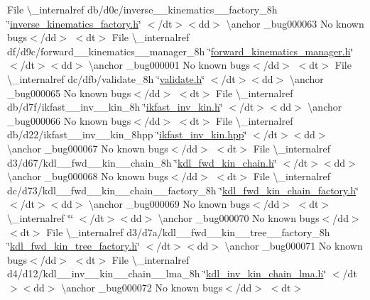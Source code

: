 \begin{DoxyRefList}
\+File \textbackslash{}\+\_\+internalref db/d0c/inverse\+\_\+\+\_\+kinematics\+\_\+\+\_\+factory\+\_\+8h \char`\"{}\mbox{\hyperlink{inverse__kinematics__factory_8h}{inverse\+\_\+kinematics\+\_\+factory.\+h}}\char`\"{} $<$/dt$>$$<$dd$>$ \textbackslash{}anchor \+\_\+bug000063 No known bugs$<$/dd$>$ $<$dt$>$
\+File \textbackslash{}\+\_\+internalref df/d9c/forward\+\_\+\+\_\+kinematics\+\_\+\+\_\+manager\+\_\+8h \char`\"{}\mbox{\hyperlink{forward__kinematics__manager_8h}{forward\+\_\+kinematics\+\_\+manager.\+h}}\char`\"{} $<$/dt$>$$<$dd$>$ \textbackslash{}anchor \+\_\+bug000001 No known bugs$<$/dd$>$ $<$dt$>$
\+File \textbackslash{}\+\_\+internalref dc/dfb/validate\+\_\+8h \char`\"{}\mbox{\hyperlink{validate_8h}{validate.\+h}}\char`\"{} $<$/dt$>$$<$dd$>$ \textbackslash{}anchor \+\_\+bug000065 No known bugs$<$/dd$>$ $<$dt$>$
\+File \textbackslash{}\+\_\+internalref db/d7f/ikfast\+\_\+\+\_\+inv\+\_\+\+\_\+kin\+\_\+8h \char`\"{}\mbox{\hyperlink{ikfast__inv__kin_8h}{ikfast\+\_\+inv\+\_\+kin.\+h}}\char`\"{} $<$/dt$>$$<$dd$>$ \textbackslash{}anchor \+\_\+bug000066 No known bugs$<$/dd$>$ $<$dt$>$
\+File \textbackslash{}\+\_\+internalref db/d22/ikfast\+\_\+\+\_\+inv\+\_\+\+\_\+kin\+\_\+8hpp \char`\"{}\mbox{\hyperlink{ikfast__inv__kin_8hpp}{ikfast\+\_\+inv\+\_\+kin.\+hpp}}\char`\"{} $<$/dt$>$$<$dd$>$ \textbackslash{}anchor \+\_\+bug000067 No known bugs$<$/dd$>$ $<$dt$>$
\+File \textbackslash{}\+\_\+internalref d3/d67/kdl\+\_\+\+\_\+fwd\+\_\+\+\_\+kin\+\_\+\+\_\+chain\+\_\+8h \char`\"{}\mbox{\hyperlink{kdl__fwd__kin__chain_8h}{kdl\+\_\+fwd\+\_\+kin\+\_\+chain.\+h}}\char`\"{} $<$/dt$>$$<$dd$>$ \textbackslash{}anchor \+\_\+bug000068 No known bugs$<$/dd$>$ $<$dt$>$
\+File \textbackslash{}\+\_\+internalref dc/d73/kdl\+\_\+\+\_\+fwd\+\_\+\+\_\+kin\+\_\+\+\_\+chain\+\_\+\+\_\+factory\+\_\+8h \char`\"{}\mbox{\hyperlink{kdl__fwd__kin__chain__factory_8h}{kdl\+\_\+fwd\+\_\+kin\+\_\+chain\+\_\+factory.\+h}}\char`\"{} $<$/dt$>$$<$dd$>$ \textbackslash{}anchor \+\_\+bug000069 No known bugs$<$/dd$>$ $<$dt$>$
 \textbackslash{}\+\_\+internalref  \char`\"{}\char`\"{} $<$/dt$>$$<$dd$>$ \textbackslash{}anchor \+\_\+bug000070 No known bugs$<$/dd$>$ $<$dt$>$
\+File \textbackslash{}\+\_\+internalref d3/d7a/kdl\+\_\+\+\_\+fwd\+\_\+\+\_\+kin\+\_\+\+\_\+tree\+\_\+\+\_\+factory\+\_\+8h \char`\"{}\mbox{\hyperlink{kdl__fwd__kin__tree__factory_8h}{kdl\+\_\+fwd\+\_\+kin\+\_\+tree\+\_\+factory.\+h}}\char`\"{} $<$/dt$>$$<$dd$>$ \textbackslash{}anchor \+\_\+bug000071 No known bugs$<$/dd$>$ $<$dt$>$
\+File \textbackslash{}\+\_\+internalref d4/d12/kdl\+\_\+\+\_\+inv\+\_\+\+\_\+kin\+\_\+\+\_\+chain\+\_\+\+\_\+lma\+\_\+8h \char`\"{}\mbox{\hyperlink{kdl__inv__kin__chain__lma_8h}{kdl\+\_\+inv\+\_\+kin\+\_\+chain\+\_\+lma.\+h}}\char`\"{} $<$/dt$>$$<$dd$>$ \textbackslash{}anchor \+\_\+bug000072 No known bugs$<$/dd$>$ $<$dt$>$

\end{DoxyRefList}
